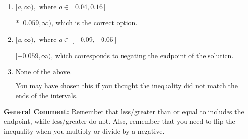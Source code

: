 \documentclass{extbook}[14pt]
\begin{document}
\begin{enumerate}
{\begin{enumerate}[label=\Alph*.]
 $(-\infty, -0.059]$, which corresponds to switching the direction of the interval AND negating the endpoint. You likely did this if you did not flip the inequality when dividing by a negative as well as not moving values over to a side properly.
\item \( [a, \infty), \text{ where } a \in [0.04, 0.16] \)

* $[0.059, \infty)$, which is the correct option.
\item \( [a, \infty), \text{ where } a \in [-0.09, -0.05] \)

 $[-0.059, \infty)$, which corresponds to negating the endpoint of the solution.
\item \( \text{None of the above}. \)

You may have chosen this if you thought the inequality did not match the ends of the intervals.
\end{enumerate}

\textbf{General Comment:} Remember that less/greater than or equal to includes the endpoint, while less/greater do not. Also, remember that you need to flip the inequality when you multiply or divide by a negative.
}
\end{enumerate}
\end{document}
